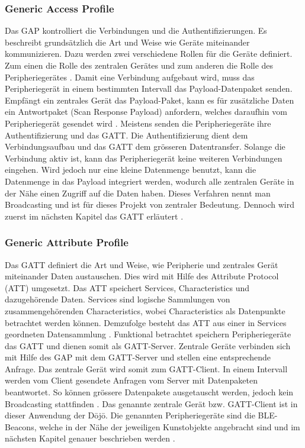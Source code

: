 \subsubsection{Generic Access Profile}
Das GAP kontrolliert die Verbindungen und die Authentifizierungen. Es beschreibt grundsätzlich die Art und Weise wie Geräte miteinander kommunizieren. Dazu werden zwei verschiedene Rollen für die Geräte definiert. Zum einen die Rolle des zentralen Gerätes und zum anderen die Rolle des Peripheriegerätes \cite{7_Teildokument_BT}. Damit eine Verbindung aufgebaut wird, muss das Peripheriegerät in einem bestimmten Intervall das Payload-Datenpaket senden. Empfängt ein zentrales Gerät das Payload-Paket, kann es für zusätzliche Daten ein Antwortpaket (Scan Response Payload) anfordern, welches daraufhin vom Peripheriegerät gesendet wird \cite{7_Teildokument_BT}. Meistens senden die Peripheriegeräte ihre Authentifizierung und das GATT. Die Authentifizierung dient dem Verbindungsaufbau und das GATT dem grösseren Datentransfer. Solange die Verbindung aktiv ist, kann das Peripheriegerät keine weiteren Verbindungen eingehen. Wird jedoch nur eine kleine Datenmenge benutzt, kann die Datenmenge in das Payload integriert werden, wodurch alle zentralen Geräte in der Nähe einen Zugriff auf die Daten haben. Dieses Verfahren nennt man Broadcasting und ist für dieses Projekt von zentraler Bedeutung. Dennoch wird zuerst im nächsten Kapitel das GATT erläutert \cite{7_Teildokument_BT}.

\subsubsection{Generic Attribute Profile}
Das GATT definiert die Art und Weise, wie Peripherie und zentrales Gerät miteinander Daten austauschen. Dies wird mit Hilfe des Attribute Protocol (ATT) \cite{8_Teildokument_BT} umgesetzt. Das ATT speichert Services, Characteristics und dazugehörende Daten. Services sind logische Sammlungen von zusammengehörenden Characteristics, wobei Characteristics als Datenpunkte betrachtet werden können. Demzufolge besteht das ATT aus einer in Services geordneten Datensammlung \cite{8_Teildokument_BT}. Funktional betrachtet speichern Peripheriegeräte das GATT und dienen somit als GATT-Server. Zentrale Geräte verbinden sich mit Hilfe des GAP mit dem GATT-Server und stellen eine entsprechende Anfrage. Das zentrale Gerät wird somit zum GATT-Client. In einem Intervall werden vom Client gesendete Anfragen vom Server mit Datenpaketen beantwortet. So können grössere Datenpakete ausgetauscht werden, jedoch kein Broadcasting stattfinden \cite{8_Teildokument_BT}. Das genannte zentrale Gerät bzw. GATT-Client ist in dieser Anwendung der Dōjō. Die genannten Peripheriegeräte sind die BLE-Beacons, welche in der Nähe der jeweiligen Kunstobjekte angebracht sind und im nächsten Kapitel genauer beschrieben werden \cite{8_Teildokument_BT}.

